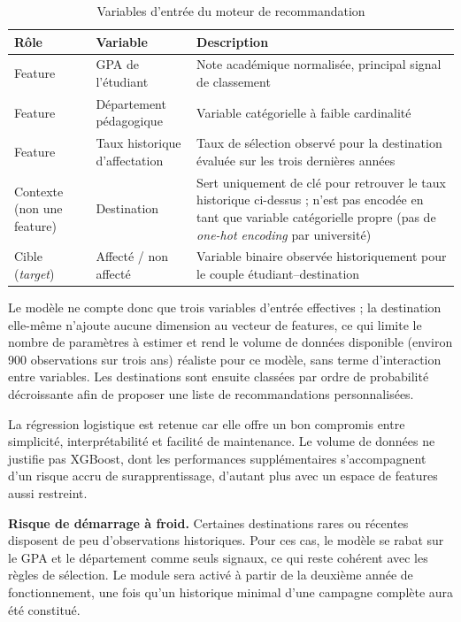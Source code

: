 \renewcommand{\arraystretch}{1.3}
\begin{table}[H]
\centering
\caption{Variables d'entrée du moteur de recommandation}
\label{tab:features_reco}
\footnotesize
\begin{tabular}{|p{2.5cm}|p{3.5cm}|p{6cm}|}
\hline
\rowcolor{gray!20}
\textbf{Rôle} & \textbf{Variable} & \textbf{Description} \\
\hline
Feature & GPA de l'étudiant & Note académique normalisée, principal signal de classement \\
\hline
Feature & Département pédagogique & Variable catégorielle à faible cardinalité \\
\hline
Feature & Taux historique d'affectation & Taux de sélection observé pour la destination évaluée sur les trois dernières années \\
\hline
Contexte (non une feature) & Destination & Sert uniquement de clé pour retrouver le taux historique ci-dessus ; n'est pas encodée en tant que variable catégorielle propre (pas de \textit{one-hot encoding} par université) \\
\hline
Cible (\textit{target}) & Affecté / non affecté & Variable binaire observée historiquement pour le couple étudiant–destination \\
\hline
\end{tabular}
\end{table}

Le modèle ne compte donc que trois variables d'entrée effectives ; la
destination elle-même n'ajoute aucune dimension au vecteur de features,
ce qui limite le nombre de paramètres à estimer et rend le volume de
données disponible (environ 900 observations sur trois ans) réaliste
pour ce modèle, sans terme d'interaction entre variables. Les
destinations sont ensuite classées par ordre de probabilité décroissante
afin de proposer une liste de recommandations personnalisées.

La régression logistique est retenue car elle offre un bon compromis
entre simplicité, interprétabilité et facilité de maintenance. Le volume
de données ne justifie pas XGBoost, dont les performances supplémentaires
s'accompagnent d'un risque accru de surapprentissage, d'autant plus avec
un espace de features aussi restreint.

\textbf{Risque de démarrage à froid.} Certaines destinations rares ou
récentes disposent de peu d'observations historiques. Pour ces cas, le
modèle se rabat sur le GPA et le département comme seuls signaux, ce qui
reste cohérent avec les règles de sélection. Le module sera activé à
partir de la deuxième année de fonctionnement, une fois qu'un historique
minimal d'une campagne complète aura été constitué.



